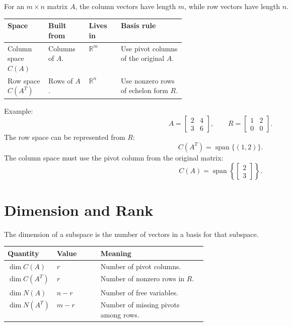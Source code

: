 \documentclass[10pt]{article}
\begin{document}
For an \(m\times n\) matrix \(A\), the column vectors have length \(m\), while row vectors have length \(n\).

\begin{center}
\small
\begin{tabularx}{\linewidth}{@{}L{0.23\linewidth}Y L{0.18\linewidth}Y@{}}
\toprule
Space & Built from & Lives in & Basis rule \\
\midrule
Column space \(C(A)\) & Columns of \(A\). & \(\mathbb{R}^m\) & Use pivot columns of the original \(A\). \\
Row space \(C(A^{T})\) & Rows of \(A\). & \(\mathbb{R}^n\) & Use nonzero rows of echelon form \(R\). \\
\bottomrule
\end{tabularx}
\end{center}

Example:
\[
A=
\begin{bmatrix}
2&4\\
3&6
\end{bmatrix},
\qquad
R=
\begin{bmatrix}
1&2\\
0&0
\end{bmatrix}.
\]
The row space can be represented from \(R\):
\[
C(A^{T})=\operatorname{span}\{(1,2)\}.
\]
The column space must use the pivot column from the original matrix:
\[
C(A)=\operatorname{span}\left\{
\begin{bmatrix}2\\3\end{bmatrix}
\right\}.
\]


\section{Dimension and Rank}

The dimension of a subspace is the number of vectors in a basis for that subspace.

\begin{center}
\small
\begin{tabularx}{\linewidth}{@{}L{0.24\linewidth}L{0.22\linewidth}Y@{}}
\toprule
Quantity & Value & Meaning \\
\midrule
\(\dim C(A)\) & \(r\) & Number of pivot columns. \\
\(\dim C(A^{T})\) & \(r\) & Number of nonzero rows in \(R\). \\
\(\dim N(A)\) & \(n-r\) & Number of free variables. \\
\(\dim N(A^{T})\) & \(m-r\) & Number of missing pivots among rows. \\
\bottomrule
\end{tabularx}
\end{center}
\end{document}
